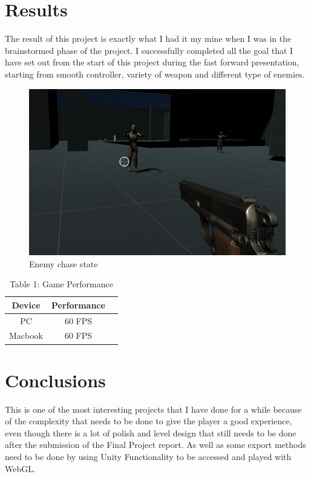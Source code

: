 \documentclass[sigconf]{acmart}
\begin{document}
\section{Results}

The result of this project is exactly what I had it my mine when I was in the brainstormed phase of the project. I successfully completed all the goal that I have set out from the start of this project during the fast forward presentation, starting from smooth controller, variety of weapon and different type of enemies. 

\begin{figure}[h]
  \centering
  \includegraphics[width=\linewidth]{gfx/wood3.png}
  \caption{Enemy chase state}
  \label{fig:example}
\end{figure}


%
\begin{table}

  \caption{Table 1: Game Performance}
  \label{tab:example}
  \begin{tabular}{ccl}
    \toprule
    Device & Performance \\ %
    \midrule
    PC & 60 FPS \\ 
    Macbook & 60 FPS \\
    \bottomrule
  \end{tabular}
\end{table}

\section{Conclusions}

This is one of the most interesting projects that I have done for a while because of the complexity that needs to be done to give the player a good experience, even though there is a lot of polish and level design that still needs to be done after the submission of the Final Project report. As well as some export methods need to be done by using Unity Functionality to be accessed and played with WebGL. 




\end{document}
